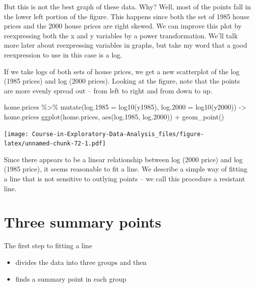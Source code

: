 \documentclass[
]{book}
\newenvironment{Shaded}{\begin{snugshade}}{\end{snugshade}}
\newcommand{\AttributeTok}[1]{\textcolor[rgb]{0.77,0.63,0.00}{#1}}
\newcommand{\FloatTok}[1]{\textcolor[rgb]{0.00,0.00,0.81}{#1}}
\newcommand{\FunctionTok}[1]{\textcolor[rgb]{0.00,0.00,0.00}{#1}}
\newcommand{\NormalTok}[1]{#1}
\newcommand{\OtherTok}[1]{\textcolor[rgb]{0.56,0.35,0.01}{#1}}
\newcommand{\SpecialCharTok}[1]{\textcolor[rgb]{0.00,0.00,0.00}{#1}}
\providecommand{\tightlist}{%
  \setlength{\itemsep}{0pt}\setlength{\parskip}{0pt}}
\begin{document}
But this is not the best graph of these data. Why? Well, most of the points fall in the lower left portion of the figure. This happens since both the set of 1985 house prices and the 2000 house prices are right skewed. We can improve this plot by reexpressing both the x and y variables by a power transformation. We'll talk more later about reexpressing variables in graphs, but take my word that a good reexpression to use in this case is a log.

If we take logs of both sets of house prices, we get a new scatterplot of the log (1985 prices) and log (2000 prices). Looking at the figure, note that the points are more evenly spread out -- from left to right and from down to up.

\begin{Shaded}
\begin{Highlighting}[]
\NormalTok{home.prices }\SpecialCharTok{\%\textgreater{}\%} 
  \FunctionTok{mutate}\NormalTok{(}\AttributeTok{log.1985 =} \FunctionTok{log10}\NormalTok{(y1985),}
         \AttributeTok{log.2000 =} \FunctionTok{log10}\NormalTok{(y2000)) }\OtherTok{{-}\textgreater{}}\NormalTok{ home.prices }
  \FunctionTok{ggplot}\NormalTok{(home.prices, }\FunctionTok{aes}\NormalTok{(log}\FloatTok{.1985}\NormalTok{, log}\FloatTok{.2000}\NormalTok{)) }\SpecialCharTok{+}
  \FunctionTok{geom\_point}\NormalTok{()}
\end{Highlighting}
\end{Shaded}

\texttt{[image: Course-in-Exploratory-Data-Analysis\_files/figure-latex/unnamed-chunk-72-1.pdf]}

Since there appears to be a linear relationship between log (2000 price) and log (1985 price), it seems reasonable to fit a line. We describe a simple way of fitting a line that is not sensitive to outlying points -- we call this procedure a resistant line.

\hypertarget{three-summary-points}{%
\section{Three summary points}\label{three-summary-points}}

The first step to fitting a line

\begin{itemize}
\tightlist
\item
  divides the data into three groups and then
\item
  finds a summary point in each group
\end{itemize}
\end{document}
